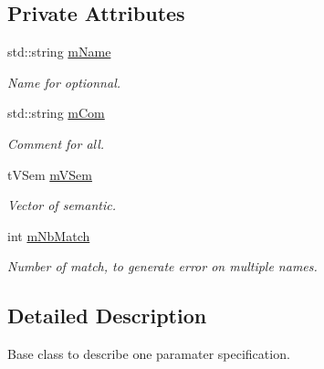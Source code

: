 \subsection*{Private Attributes}
\begin{DoxyCompactItemize}
\item 
std\+::string \hyperlink{classMMVII_1_1cSpecOneArg2007_a2b13c7d1840d5293448b1770b95804d8}{m\+Name}\hypertarget{classMMVII_1_1cSpecOneArg2007_a2b13c7d1840d5293448b1770b95804d8}{}\label{classMMVII_1_1cSpecOneArg2007_a2b13c7d1840d5293448b1770b95804d8}

\begin{DoxyCompactList}\small\item\em Name for optionnal. \end{DoxyCompactList}\item 
std\+::string \hyperlink{classMMVII_1_1cSpecOneArg2007_abd52450cd072f111e3c6e24271afc6d0}{m\+Com}\hypertarget{classMMVII_1_1cSpecOneArg2007_abd52450cd072f111e3c6e24271afc6d0}{}\label{classMMVII_1_1cSpecOneArg2007_abd52450cd072f111e3c6e24271afc6d0}

\begin{DoxyCompactList}\small\item\em Comment for all. \end{DoxyCompactList}\item 
t\+V\+Sem \hyperlink{classMMVII_1_1cSpecOneArg2007_a73fc063733564c6debfdf6a81e8d78d2}{m\+V\+Sem}\hypertarget{classMMVII_1_1cSpecOneArg2007_a73fc063733564c6debfdf6a81e8d78d2}{}\label{classMMVII_1_1cSpecOneArg2007_a73fc063733564c6debfdf6a81e8d78d2}

\begin{DoxyCompactList}\small\item\em Vector of semantic. \end{DoxyCompactList}\item 
int \hyperlink{classMMVII_1_1cSpecOneArg2007_ad91d8fab50891f5782a8e30ef97a9dc2}{m\+Nb\+Match}\hypertarget{classMMVII_1_1cSpecOneArg2007_ad91d8fab50891f5782a8e30ef97a9dc2}{}\label{classMMVII_1_1cSpecOneArg2007_ad91d8fab50891f5782a8e30ef97a9dc2}

\begin{DoxyCompactList}\small\item\em Number of match, to generate error on multiple names. \end{DoxyCompactList}\end{DoxyCompactItemize}


\subsection{Detailed Description}
Base class to describe one paramater specification. 

